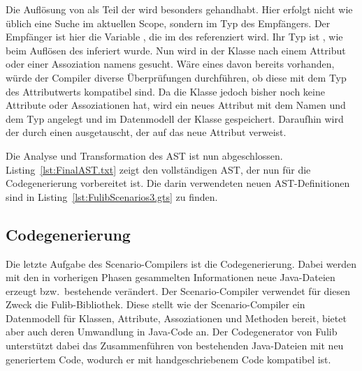 Die Auflösung von  als Teil der  wird besonders gehandhabt.
Hier erfolgt nicht wie üblich eine Suche im aktuellen Scope, sondern im Typ des Empfängers.
Der Empfänger ist hier die Variable , die im  des  referenziert wird.
Ihr Typ ist , wie beim Auflösen des  inferiert wurde.
Nun wird in der Klasse  nach einem Attribut oder einer Assoziation namens  gesucht.
Wäre eines davon bereits vorhanden, würde der Compiler diverse Überprüfungen durchführen, ob diese mit dem Typ des Attributwerts kompatibel sind.
Da die Klasse  jedoch bisher noch keine Attribute oder Assoziationen hat, wird ein neues Attribut mit dem Namen  und dem Typ  angelegt und im Datenmodell der Klasse  gespeichert.
Daraufhin wird der  durch einen  ausgetauscht, der auf das neue Attribut verweist.

Die Analyse und Transformation des AST ist nun abgeschlossen.
Listing~\ref{lst:FinalAST.txt} zeigt den vollständigen AST, der nun für die Codegenerierung vorbereitet ist.
Die darin verwendeten neuen AST-Definitionen sind in Listing~\ref{lst:FulibScenarios3.gts} zu finden.



\subsection{Codegenerierung}\label{subsec:codegen-fulib}

Die letzte Aufgabe des Scenario-Compilers ist die Codegenerierung.
Dabei werden mit den in vorherigen Phasen gesammelten Informationen neue Java-Dateien erzeugt bzw.\ bestehende verändert.
Der Scenario-Compiler verwendet für diesen Zweck die Fulib-Bibliothek\cite{fulib}.
Diese stellt wie der Scenario-Compiler ein Datenmodell für Klassen, Attribute, Assoziationen und Methoden bereit, bietet aber auch deren Umwandlung in Java-Code an.
Der Codegenerator von Fulib unterstützt dabei das Zusammenführen von bestehenden Java-Dateien mit neu generiertem Code, wodurch er mit handgeschriebenem Code kompatibel ist.

